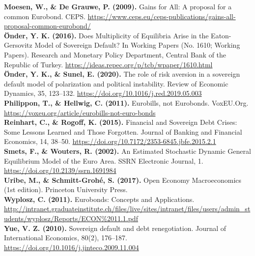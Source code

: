 \textbf{Moesen, W., \& De Grauwe, P. (2009).} Gains for All: A proposal for a common Eurobond. CEPS. \url{https://www.ceps.eu/ceps-publications/gains-all-proposal-common-eurobond/}\\

\textbf{Önder, Y. K. (2016).} Does Multiplicity of Equilibria Arise in the Eaton-Gersovitz Model of Sovereign
Default? In Working Papers (No. 1610; Working Papers). Research and Monetary Policy Department, Central Bank of the Republic of Turkey. \url{https://ideas.repec.org/p/tcb/wpaper/1610.html}\\

\textbf{Önder, Y. K., \& Sunel, E. (2020).} The role of risk aversion in a sovereign default model of polarization and political instability. Review of Economic Dynamics, 35, 123–132. \url{https://doi.org/10.1016/j.red.2019.05.003}\\

\textbf{Philippon, T., \& Hellwig, C. (2011).} Eurobills, not Eurobonds. VoxEU.Org. \url{https://voxeu.org/article/eurobills-not-euro-bonds}\\

\textbf{Reinhart, C., \& Rogoff, K. (2015).} Financial and Sovereign Debt Crises: Some Lessons Learned and Those Forgotten. Journal of Banking and Financial Economics, 14, 38–50. \url{https://doi.org/10.7172/2353-6845.jbfe.2015.2.1}\\

\textbf{Smets, F., \& Wouters, R. (2002).} An Estimated Stochastic Dynamic General Equilibrium Model of the Euro Area. SSRN Electronic Journal, 1. \url{https://doi.org/10.2139/ssrn.1691984}\\

\textbf{Uribe, M., \& Schmitt-Grohé, S. (2017).} Open Economy Macroeconomics (1st edition). Princeton University Press.\\

\textbf{Wyplosz, C. (2011).} Eurobonds: Concepts and Applications. \url{http://intranet.graduateinstitute.ch/files/live/sites/intranet/files/users/admin_students/wyplosz/Reports/ECON%2011.1.pdf}\\

\textbf{Yue, V. Z. (2010).} Sovereign default and debt renegotiation. Journal of International Economics, 80(2), 176–187. \url{https://doi.org/10.1016/j.jinteco.2009.11.004}\\